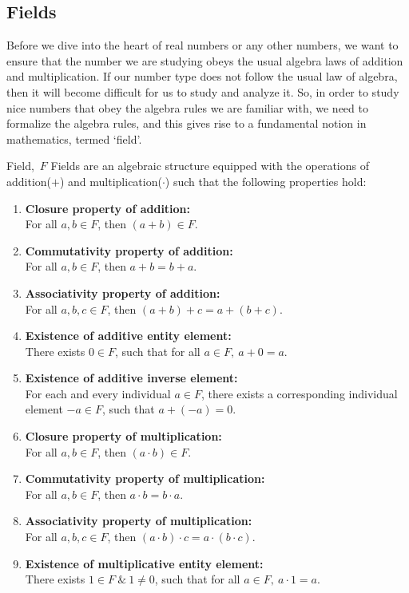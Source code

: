 \subsection{Fields}
Before we dive into the heart of real numbers or any other numbers, we want to ensure that the number we are studying obeys the usual algebra laws of addition and multiplication. If our number type does not follow the usual law of algebra, then it will become difficult for us to study and analyze it. So, in order to study nice numbers that obey the algebra rules we are familiar with, we need to formalize the algebra rules, and this gives rise to a fundamental notion in mathematics, termed `field'.
\bigskip
\begin{Definition}{Field,\ $F$}\label{field}
Fields are an algebraic structure equipped with the operations of addition($+$) and multiplication($\cdot$) such that the following properties hold:
\begin{enumerate}
    \item \textbf{Closure property of addition:}\\ For all $a,b\in F$, then $(a+b)\in F$.
    \item \textbf{Commutativity property of addition:}\\ For all $a,b\in F$, then $a+b=b+a$.
    \item \textbf{Associativity property of addition:}\\ For all $a,b,c\in F$, then $(a+b)+c=a+(b+c)$.
    \item \textbf{Existence of additive entity element:}\\ There exists $0\in F$, such that for all $a\in F,\ a+0=a$.
    \item \textbf{Existence of additive inverse element:}\\ For each and every individual $a\in F$, there exists a corresponding individual element $-a\in F$, such that \newline $a+(-a)=0$.
    \item \textbf{Closure property of multiplication:}\\ For all $a,b\in F$, then $(a\cdot b)\in F$.
    \item \textbf{Commutativity property of multiplication:}\\ For all $a,b\in F$, then $a \cdot b=b\cdot a$.
    \item \textbf{Associativity property of multiplication:}\\ For all $a,b,c\in F$, then $(a\cdot b)\cdot c=a\cdot (b\cdot c)$.
    \item \textbf{Existence of multiplicative entity element:}\\ There exists $1\in F\ \&\ 1\neq 0$, such that for all $a\in F,\ a\cdot1=a$.

\end{enumerate}
\end{Definition}
